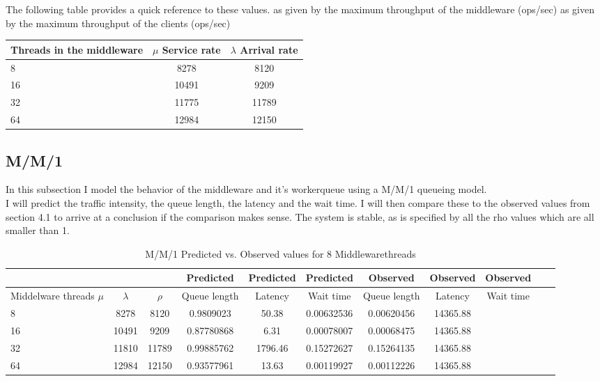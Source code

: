 \documentclass[11pt,a4paper]{article}
\begin{document}

The following table provides a quick reference to these values.
as given by the maximum throughput of the middleware (ops/sec) 
as given by the maximum throughput of the clients (ops/sec) 

\begin{center}
	\scriptsize{
		\begin{tabular}{|l|c|c|}
			\hline Threads in the middleware & 
			$\mu$ Service rate &
			$\lambda$ Arrival rate \\ 
			\hline 8 &   8278 & 8120 \\ 
			\hline 16 &  10491 & 9209 \\ 
			\hline 32 &  11775 & 11789 \\
			\hline 64 &  12984 & 12150 \\
			\hline
		\end{tabular}
	} 
\end{center}



\subsection{M/M/1}
In this subsection I model the behavior of the middleware and it's workerqueue using a M/M/1 queueing model. \\

I will predict the traffic intensity, the queue length, the latency and the wait time.
I will then compare these to the observed values from section 4.1 to arrive at a conclusion if the comparison makes sense.
The system is stable, as is specified by all the rho values which are all smaller than 1.

\begin{table}[H]
	\caption{M/M/1 Predicted vs. Observed values for 8 Middlewarethreads}
	\scriptsize{
		\begin{tabular}{|l|c|c|c|c|c|c|c|c|c|c|}
					\hline & & & Predicted & Predicted & Predicted & Observed & Observed & Observed &\\ 
			\hline Middelware threads $\mu$ & $\lambda$ & $\rho$ & Queue length & Latency & Wait time & Queue length & Latency & Wait time \\ 
			\hline 8 & 8278 & 8120 & 0.9809023 & 50.38 & 0.00632536 & 0.00620456 &  14365.88 \\ 
			\hline 16 & 10491 & 9209 & 0.87780868 & 6.31 & 0.00078007 & 0.00068475 &  14365.88 \\ 
			\hline 32 & 11810 & 11789 & 0.99885762 & 1796.46 & 0.15272627 & 0.15264135 &  14365.88 \\ 
			\hline 64 & 12984 & 12150 & 0.93577961 & 13.63 & 0.00119927 & 0.00112226 &  14365.88 \\ 
			\hline
		\end{tabular}
	} 
\end{table}
\end{document}
